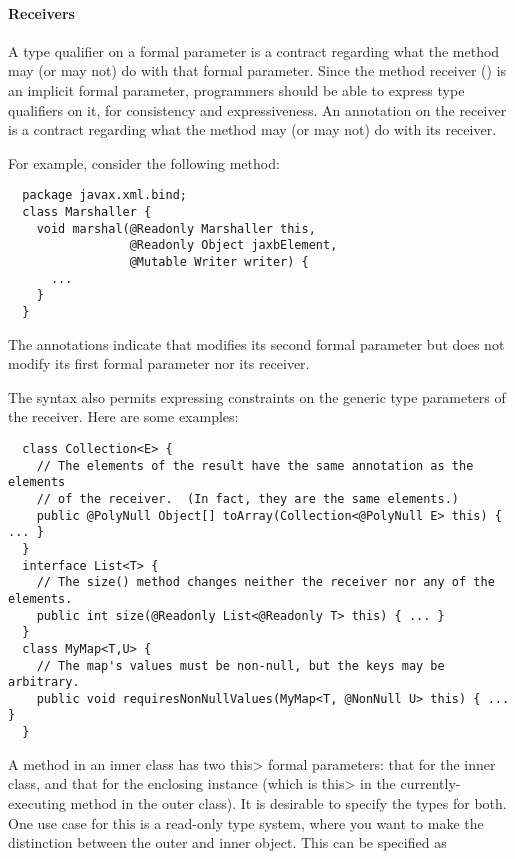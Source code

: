 \documentclass[10pt]{article}
\begin{document}
\paragraph{Receivers\label{receivers}}
A type qualifier on a formal parameter is a contract regarding what the
method may (or may not) do with that formal parameter.  Since the method receiver
() is an implicit formal parameter, programmers should be able
to express type qualifiers on it, for consistency and expressiveness.  An
annotation on the receiver is a contract regarding what the method may
(or may not) do with its receiver.



For example, consider the following method:

\preverbnegspace
\begin{Verbatim}
  package javax.xml.bind;
  class Marshaller {
    void marshal(@Readonly Marshaller this,
                 @Readonly Object jaxbElement,
                 @Mutable Writer writer) {
      ...
    }
  }
\end{Verbatim}

\noindent
The annotations indicate that  modifies its second formal parameter
but does not modify its first formal parameter nor its receiver.

The syntax also permits expressing constraints on the
generic type parameters of the receiver.  Here are some examples:

\preverbnegspace
\begin{Verbatim}
  class Collection<E> {
    // The elements of the result have the same annotation as the elements
    // of the receiver.  (In fact, they are the same elements.)
    public @PolyNull Object[] toArray(Collection<@PolyNull E> this) { ... }
  }
  interface List<T> {
    // The size() method changes neither the receiver nor any of the elements.
    public int size(@Readonly List<@Readonly T> this) { ... }
  }
  class MyMap<T,U> {
    // The map's values must be non-null, but the keys may be arbitrary.
    public void requiresNonNullValues(MyMap<T, @NonNull U> this) { ... }
  }
\end{Verbatim}

A method in an inner class has two \<this> formal parameters:  that for the inner
class, and that for the enclosing instance (which is \<this> in the currently-executing method in the outer class).  It
is desirable to specify the types for both.  
One use case for this is a read-only type system, where you want to
make the distinction between the outer and inner object.
This can be specified as
\end{document}
